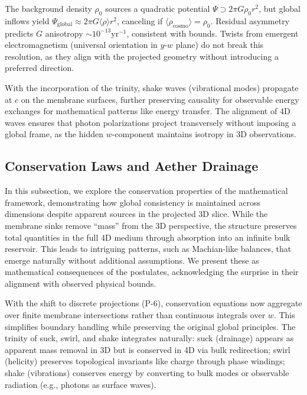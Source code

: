 The background density $\rho_0$ sources a quadratic potential $\Psi \supset 2\pi G \rho_0 r^2$, but global inflows yield $\Psi_{\text{global}} \approx 2\pi G \langle \rho \rangle r^2$, canceling if $\langle \rho_{\text{cosmo}} \rangle = \rho_0$. Residual asymmetry predicts $G$ anisotropy $\sim 10^{-13} \text{yr}^{-1}$, consistent with bounds. Twists from emergent electromagnetism (universal orientation in $y$-$w$ plane) do not break this resolution, as they align with the projected geometry without introducing a preferred direction.

With the incorporation of the trinity, shake waves (vibrational modes) propagate at $c$ on the membrane surfaces, further preserving causality for observable energy exchanges for mathematical patterns like energy transfer. The alignment of 4D waves ensures that photon polarizations project transversely without imposing a global frame, as the hidden $w$-component maintains isotropy in 3D observations.

\medskip
\noindent
{}
\medskip

\subsection{Conservation Laws and Aether Drainage}

In this subsection, we explore the conservation properties of the mathematical framework, demonstrating how global consistency is maintained across dimensions despite apparent sources in the projected 3D slice. While the membrane sinks remove ``mass'' from the 3D perspective, the structure preserves total quantities in the full 4D medium through absorption into an infinite bulk reservoir. This leads to intriguing patterns, such as Machian-like balances, that emerge naturally without additional assumptions. We present these as mathematical consequences of the postulates, acknowledging the surprise in their alignment with observed physical bounds.

With the shift to discrete projections (P-6), conservation equations now aggregate over finite membrane intersections rather than continuous integrals over $w$. This simplifies boundary handling while preserving the original global principles. The trinity of suck, swirl, and shake integrates naturally: suck (drainage) appears as apparent mass removal in 3D but is conserved in 4D via bulk redirection; swirl (helicity) preserves topological invariants like charge through phase windings; shake (vibrations) conserves energy by converting to bulk modes or observable radiation (e.g., photons as surface waves).


